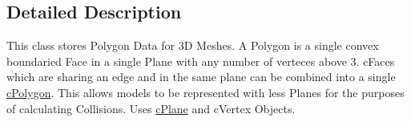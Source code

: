 \subsection{Detailed Description}
This class stores Polygon Data for 3D Meshes. A Polygon is a single convex boundaried Face in a single Plane with any number of verteces above 3. cFaces which are sharing an edge and in the same plane can be combined into a single \hyperlink{classc_polygon}{cPolygon}. This allows models to be represented with less Planes for the purposes of calculating Collisions. Uses \hyperlink{classc_plane}{cPlane} and cVertex Objects. 